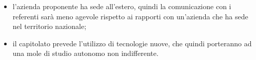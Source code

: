 \begin{itemize}

\item l'azienda proponente ha sede all'estero, quindi la comunicazione con i referenti sarà meno agevole rispetto ai rapporti con un'azienda che ha sede nel territorio nazionale;
\item il capitolato prevede l'utilizzo di tecnologie nuove, che quindi porteranno ad una mole di studio autonomo non indifferente.

\end{itemize}